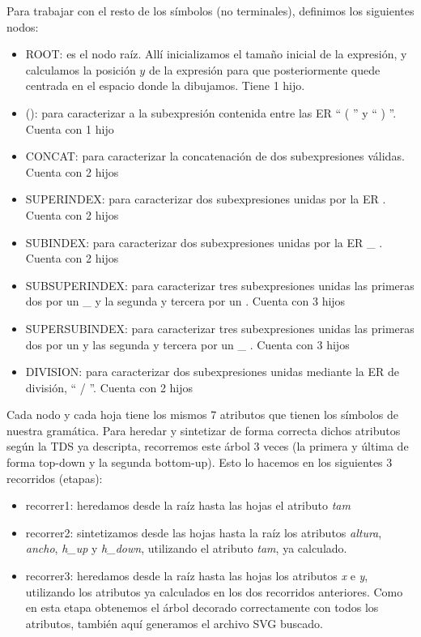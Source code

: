 \documentclass[a4paper, 10pt, twoside]{article}
\begin{document}
Para trabajar con el resto de los símbolos (no terminales), definimos los siguientes nodos:
\begin{itemize}
  \item ROOT: es el nodo raíz. Allí inicializamos el tamaño inicial de la expresión, y calculamos la posición $y$ de la expresión para que posteriormente quede centrada en el espacio donde la dibujamos. Tiene 1 hijo.
  \item (): para caracterizar a la subexpresión contenida entre las ER `` ( '' y `` ) ''. Cuenta con 1 hijo
  \item CONCAT: para caracterizar la concatenación de dos subexpresiones válidas. Cuenta con 2 hijos
  \item SUPERINDEX: para caracterizar dos subexpresiones unidas por la ER \detokenize{^}. Cuenta con 2 hijos
  \item SUBINDEX: para caracterizar dos subexpresiones unidas por la ER \_ . Cuenta con 2 hijos
  \item SUBSUPERINDEX: para caracterizar tres subexpresiones unidas las primeras dos por un \_ y la segunda y tercera por un \detokenize{^}. Cuenta con 3 hijos
  \item SUPERSUBINDEX: para caracterizar tres subexpresiones unidas las primeras dos por un \detokenize{^} y las segunda y tercera por un \_ . Cuenta con 3 hijos
  \item DIVISION: para caracterizar dos subexpresiones unidas mediante la ER de división, `` / ''. Cuenta con 2 hijos
\end{itemize}

Cada nodo y cada hoja tiene los mismos 7 atributos que tienen los símbolos de nuestra gramática. Para heredar y sintetizar de forma correcta dichos atributos según la TDS ya descripta, recorremos este árbol 3 veces (la primera y última de forma top-down y la segunda bottom-up). Esto lo hacemos en los siguientes 3 recorridos (etapas):
\begin{itemize}
  \item recorrer1: heredamos desde la raíz hasta las hojas el atributo \emph{tam}
  \item recorrer2: sintetizamos desde las hojas hasta la raíz los atributos \emph{altura}, \emph{ancho}, \emph{h\_up} y \emph{h\_down}, utilizando el atributo \emph{tam}, ya calculado.
  \item recorrer3: heredamos desde la raíz hasta las hojas los atributos \emph{x} e \emph{y}, utilizando los atributos ya calculados en los dos recorridos anteriores. Como en esta etapa obtenemos el árbol decorado correctamente con todos los atributos, también aquí generamos el archivo SVG buscado.
\end{itemize}
\end{document}
